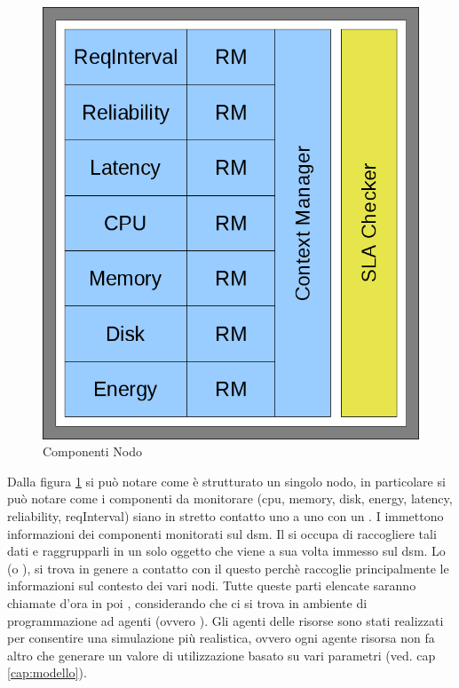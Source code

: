 \begin{figure}[H]
\begin{center}
\includegraphics[scale=0.5]{etc/nodo.png}
\caption{Componenti Nodo}
\label{componentinodo}
\end{center}
\end{figure}
Dalla figura \ref{componentinodo} si può notare come è strutturato un singolo nodo, in particolare si può notare come i componenti da monitorare (cpu, memory, disk, energy, latency, reliability, reqInterval) siano in stretto contatto uno a uno con un . I  immettono informazioni dei componenti monitorati sul dsm. Il  si occupa di raccogliere tali dati e raggrupparli in un solo oggetto che viene a sua volta immesso sul dsm. Lo  (o ), si trova in genere a contatto con il  questo perchè raccoglie principalmente le informazioni sul contesto dei vari nodi. Tutte queste parti elencate saranno chiamate d'ora in poi , considerando che ci si trova in ambiente di programmazione ad agenti (ovvero ). Gli agenti delle risorse sono stati realizzati per consentire una simulazione più realistica, ovvero ogni agente risorsa non fa altro che generare un valore di utilizzazione basato su vari parametri (ved. cap \ref{cap:modello}).
